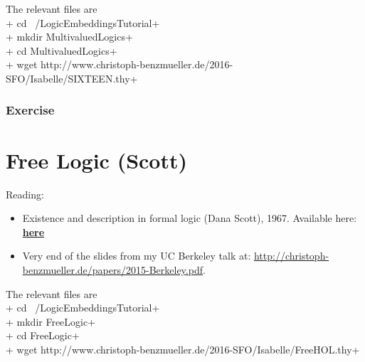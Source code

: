 \documentclass{article}
\begin{document}
The relevant files are \\[1em]
+ cd ~/LogicEmbeddingsTutorial+\\
+ mkdir MultivaluedLogics+ \\
+ cd MultivaluedLogics+ \\
+ wget http://www.christoph-benzmueller.de/2016-SFO/Isabelle/SIXTEEN.thy+ \\

\subsubsection{Exercise}



\section{Free Logic (Scott)}
Reading:
\begin{itemize}
\item Existence and description in formal logic (Dana Scott),
  1967. Available here: 
  \href{http://journals.cambridge.org/action/displayAbstract?fromPage=online&aid=9103650&fileId=S0022481200077732}{\textbf{here}}
\item Very end of the slides from my  UC Berkeley talk at:
   \href{http://christoph-benzmueller.de/papers/2015-Berkeley.pdf}{http://christoph-benzmueller.de/papers/2015-Berkeley.pdf}.
\end{itemize}


The relevant files are \\[1em]
+ cd ~/LogicEmbeddingsTutorial+\\
+ mkdir FreeLogic+ \\
+ cd FreeLogic+ \\
+ wget http://www.christoph-benzmueller.de/2016-SFO/Isabelle/FreeHOL.thy+ \\
\end{document}
